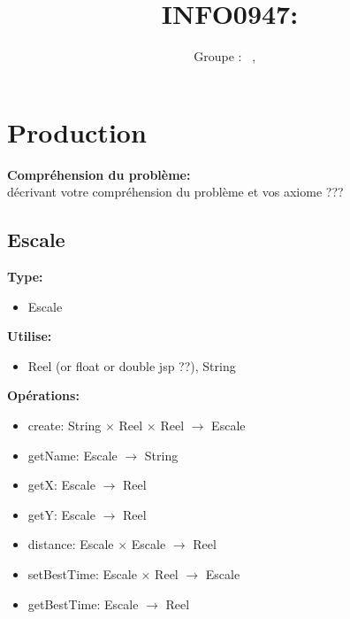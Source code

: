 \documentclass[a4paper, 11pt, oneside]{article}
\title{INFO0947: \intitule}
\author{Groupe \GrNbr : \PrenomUN~\textsc{\NomUN}, \PrenomDEUX~\textsc{\NomDEUX}}
\date{}
\begin{document}
\maketitle


\section{Production}


\textbf{Compréhension du problème:} \\
décrivant votre compréhension du problème et vos axiome ???


\subsection{Escale}

\textbf{Type:}
\begin{itemize}
    \item[] Escale
\end{itemize}

\textbf{Utilise:}
\begin{itemize}
    \item[] Reel (or float or double jsp ??), String
\end{itemize}

\textbf{Opérations:}
\begin{itemize}
    \item[] create: String $\times$ Reel $\times$ Reel $\to$ Escale
    \item[] getName: Escale $\to$ String
    \item[] getX: Escale $\to$ Reel
    \item[] getY: Escale $\to$ Reel
    \item[] distance: Escale $\times$ Escale $\to$ Reel
    \item[] setBestTime: Escale $\times$ Reel $\to$ Escale
    \item[] getBestTime: Escale $\to$ Reel
\end{itemize}
\end{document}
